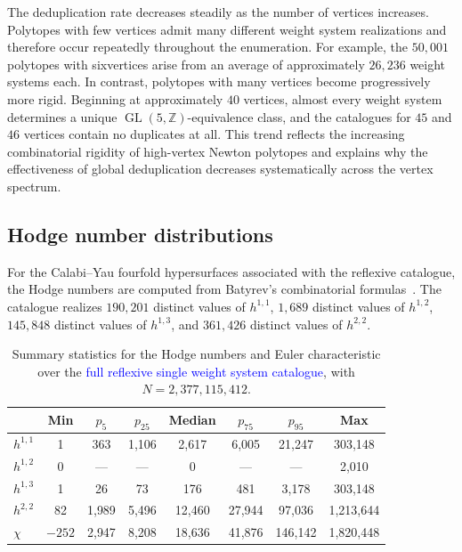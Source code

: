 \documentclass[appliedmath,article,submit,moreauthors]{Definitions/mdpi}
\newcommand{\Z}{\mathbb{Z}}
\newcommand{\GL}{\operatorname{GL}}
\begin{document}
The deduplication rate decreases steadily as the number of vertices increases.
Polytopes with few vertices admit many different weight system realizations and
therefore occur repeatedly throughout the enumeration. For example, the
\(50{,}001\) polytopes with sixvertices arise from an average of approximately
\(26{,}236\) weight systems each. In contrast, polytopes with many vertices
become progressively more rigid. Beginning at approximately \(40\) vertices,
almost every weight system determines a unique \(\GL(5,\Z)\)-equivalence class,
and the catalogues for \(45\) and \(46\) vertices contain no duplicates at all.
This trend reflects the increasing combinatorial rigidity of high-vertex Newton
polytopes and explains why the effectiveness of global deduplication decreases
systematically across the vertex spectrum.

\subsection{Hodge number distributions}
\label{sec:results-hodge}

For the Calabi--Yau fourfold hypersurfaces associated with the reflexive
catalogue, the Hodge numbers are computed from Batyrev's combinatorial
formulas~\cite{Batyrev1994,BatyrevBorisov1996}. The catalogue realizes
\(190{,}201\) distinct values of \(h^{1,1}\), \(1{,}689\) distinct values of
\(h^{1,2}\), \(145{,}848\) distinct values of \(h^{1,3}\), and \(361{,}426\)
distinct values of \(h^{2,2}\).

\begin{table}[H]
\caption{Summary statistics for the Hodge numbers and Euler characteristic over
the \textcolor{blue}{full reflexive single weight system catalogue}, with
\(N=2{,}377{,}115{,}412\).\label{tab:hodge-stats}}
\begin{tabularx}{\textwidth}{lCCCCCCC}
\toprule
 & \textbf{Min} & \textbf{\(p_5\)} & \textbf{\(p_{25}\)}
 & \textbf{Median} & \textbf{\(p_{75}\)} & \textbf{\(p_{95}\)}
 & \textbf{Max} \\
\midrule
\(h^{1,1}\) & 1     & 363   & 1{,}106 & 2{,}617  & 6{,}005  & 21{,}247  & 303{,}148 \\
\(h^{1,2}\) & 0     & ---   & ---     & 0        & ---      & ---       & 2{,}010   \\
\(h^{1,3}\) & 1     & 26    & 73      & 176      & 481      & 3{,}178   & 303{,}148 \\
\(h^{2,2}\) & 82    & 1{,}989 & 5{,}496 & 12{,}460 & 27{,}944 & 97{,}036 &
  1{,}213{,}644 \\
\(\chi\)    & \(-252\) & 2{,}947 & 8{,}208 & 18{,}636 & 41{,}876 & 146{,}142 &
  1{,}820{,}448 \\
\bottomrule
\end{tabularx}
\end{table}
\end{document}
